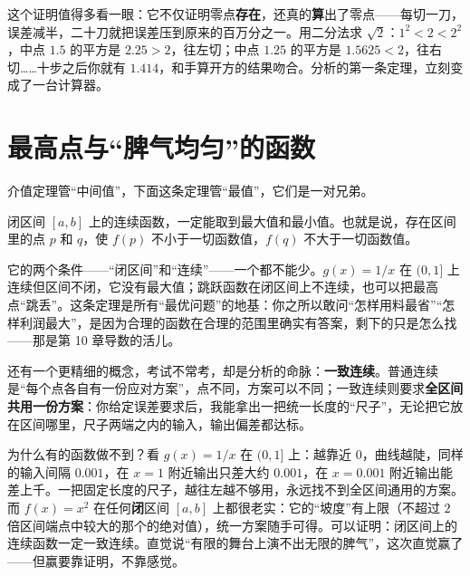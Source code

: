 \begin{center}
\end{center}

这个证明值得多看一眼：它不仅证明零点\textbf{存在}，还真的\textbf{算}出了零点——每切一刀，误差减半，二十刀就把误差压到原来的百万分之一。用二分法求 $\sqrt{2}$：$1^2<2<2^2$，中点 $1.5$ 的平方是 $2.25>2$，往左切；中点 $1.25$ 的平方是 $1.5625<2$，往右切……十步之后你就有 $1.414$，和手算开方的结果吻合。分析的第一条定理，立刻变成了一台计算器。

\section{最高点与“脾气均匀”的函数}

介值定理管“中间值”，下面这条定理管“最值”，它们是一对兄弟。

\begin{dingli}[最大值定理]
闭区间 $[a,b]$ 上的连续函数，一定能取到最大值和最小值。也就是说，存在区间里的点 $p$ 和 $q$，使 $f(p)$ 不小于一切函数值，$f(q)$ 不大于一切函数值。
\end{dingli}

它的两个条件——“闭区间”和“连续”——一个都不能少。$g(x)=1/x$ 在 $(0,1]$ 上连续但区间不闭，它没有最大值；跳跃函数在闭区间上不连续，也可以把最高点“跳丢”。这条定理是所有“最优问题”的地基：你之所以敢问“怎样用料最省”“怎样利润最大”，是因为合理的函数在合理的范围里确实有答案，剩下的只是怎么找——那是第 10 章导数的活儿。

还有一个更精细的概念，考试不常考，却是分析的命脉：\textbf{一致连续}。普通连续是“每个点各自有一份应对方案”，点不同，方案可以不同；一致连续则要求\textbf{全区间共用一份方案}：你给定误差要求后，我能拿出一把统一长度的“尺子”，无论把它放在区间哪里，尺子两端之内的输入，输出偏差都达标。

为什么有的函数做不到？看 $g(x)=1/x$ 在 $(0,1]$ 上：越靠近 $0$，曲线越陡，同样的输入间隔 $0.001$，在 $x=1$ 附近输出只差大约 $0.001$，在 $x=0.001$ 附近输出能差上千。一把固定长度的尺子，越往左越不够用，永远找不到全区间通用的方案。而 $f(x)=x^2$ 在任何\textbf{闭}区间 $[a,b]$ 上都很老实：它的“坡度”有上限（不超过 $2$ 倍区间端点中较大的那个的绝对值），统一方案随手可得。可以证明：闭区间上的连续函数一定一致连续。直觉说“有限的舞台上演不出无限的脾气”，这次直觉赢了——但赢要靠证明，不靠感觉。

